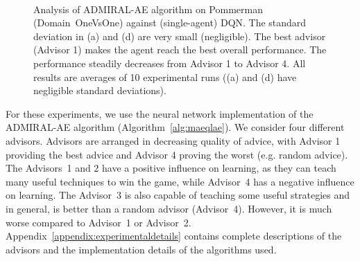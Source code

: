 \documentclass[jair, twoside,11pt,theapa]{article}
\begin{document}
\begin{figure}[h]
    \centering
	\\
  \caption{Analysis of ADMIRAL-AE algorithm on Pommerman (Domain~OneVsOne) against (single-agent) DQN. The standard deviation in (a) and (d) are very small (negligible). The best advisor (Advisor 1) makes the agent reach the best overall performance. The performance steadily decreases from Advisor 1 to Advisor 4. All results are averages of 10 experimental runs ((a) and (d) have negligible standard deviations).
  }%
	\label{fig:pommermanoffpolicy}
\end{figure}


For these experiments, we use the neural network implementation of the ADMIRAL-AE algorithm (Algorithm~\ref{alg:maeqlae}). We  consider four different advisors. 
Advisors are arranged in decreasing quality of advice, with Advisor 1 providing the best advice and Advisor 4 proving the worst (e.g. random advice).
 The Advisors~1 and 2 have a positive influence on learning, as they can teach many useful techniques to win the game, while Advisor~4 has a negative influence on learning. The Advisor~3 is also capable of teaching some useful strategies and in general, is better than a random advisor (Advisor~4). However, it is much worse compared to Advisor~1 or Advisor~2.  Appendix~\ref{appendix:experimentaldetails} contains  complete descriptions of the advisors and the implementation details of the algorithms used.
\end{document}
